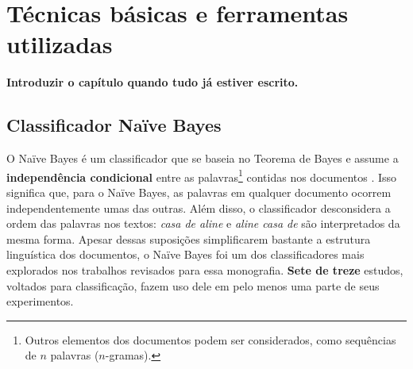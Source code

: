 \chapter{Técnicas básicas e ferramentas utilizadas}

\textbf{Introduzir o capítulo quando tudo já estiver escrito.}



\section{Classificador Naïve Bayes}
\label{subsection:naive}



O Naïve Bayes é um classificador que se baseia no Teorema de Bayes e assume a \textbf{independência condicional} entre as palavras\footnote{Outros elementos dos documentos podem ser considerados, como sequências de \ensuremath{n} palavras (\ensuremath{n}-gramas).} contidas nos documentos \cite{naive-forty}. Isso significa que, para o Naïve Bayes, as palavras em qualquer documento ocorrem independentemente umas das outras. Além disso, o classificador desconsidera a ordem das palavras nos textos: \emph{casa de aline} e \emph{aline casa de} são interpretados da mesma forma. Apesar dessas suposições simplificarem bastante a estrutura linguística dos documentos, o Naïve Bayes foi um dos classificadores mais explorados nos trabalhos revisados para essa monografia. \textbf{Sete de treze} estudos, voltados para classificação, fazem uso dele em pelo menos uma parte de seus experimentos. 

